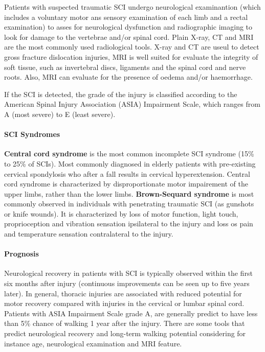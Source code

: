 \documentclass[12pt,article,oneside,a4paper]{memoir}
\begin{document}
Patients with suspected traumatic SCI undergo neurological examinantion (which includes a voluntary motor ans sensory examination of each limb and a rectal examination) to asses for neurological dysfunction and radiographic imaging to look for damage to the vertebrae and/or spinal cord.
Plain X-ray, CT and MRI are the most commonly used radiological tools. X-ray and CT are useul to detect gross fracture dislocation injuries, MRI is well suited for evaluate the integrity of soft tissue, such as invertebral discs, ligaments and the spinal cord and nerve roots. Also, MRI can evaluate for the presence of oedema and/or haemorrhage.

If the SCI is detected, the grade of the injury is classified according to the American Spinal Injury Association (ASIA) Impairment Scale, which ranges from A (most severe) to E (least severe).

\paragraph{SCI Syndromes} \textbf{Central cord syndrome} is the most common incomplete SCI syndrome (15\% to 25\% of SCIs). Most commonly diagnosed in elderly patients with pre-existing cervical spondylosis who after a fall results in cervical hyperextension. Central cord syndrome is characterized by disproportionate motor impairement of the upper limbs, rather than the lower limbs. \textbf{Brown-Sequard syndrome} is most commonly observed in individuals with penetrating traumatic SCI (as gunshots or knife wounds). It is characterized by loss of motor function, light touch, proprioception and vibration sensation ipsilateral to the injury and loss os pain and temperature sensation contralateral to the injury.

\paragraph{Prognosis} Neurological recovery in patients with SCI is typically observed within the first six months after injury (continuous improvements can be seen up to five years later). In general, thoracic injuries are associated with reduced potential for motor recovery compared with injuries in the cervical or lumbar spinal cord.
Patients with ASIA Impairment Scale grade A, are generally predict to have less than 5\% chance of walking 1 year after the injury. There are some tools that predict neurological recovery and long-term walking potential considering for instance age, neurological examination and MRI feature.
\end{document}
